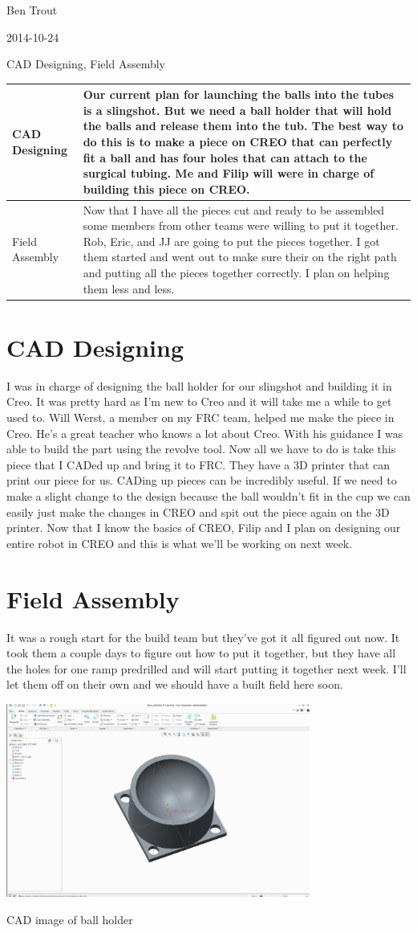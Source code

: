 Ben Trout

2014-10-24

CAD Designing, Field Assembly

\begin{tabular}{|p{5cm}|p{5cm}|}
\hline
CAD Designing&
Our current plan for launching the balls into the tubes is a slingshot. But we need a ball holder that will hold the balls and release them into the tub. The best way to do this is to make a piece on CREO that can perfectly fit a ball and has four holes that can attach to the surgical tubing. Me and Filip will were in charge of building this piece on CREO.
\\
\hline
Field Assembly&
Now that I have all the pieces cut and ready to be assembled some members from other teams were willing to put it together. Rob, Eric, and JJ are going to put the pieces together. I got them started and went out to make sure their on the right path and putting all the pieces together correctly. I plan on helping them less and less.
\\
\hline
\end{tabular}

\section*{CAD Designing}
I was in charge of designing the ball holder for our slingshot and building it in Creo. It was pretty hard as I'm new to Creo and it will take me a while to get used to. Will Werst, a member on my FRC team, helped me make the piece in Creo. He's a great teacher who knows a lot about Creo. With his guidance I was able to build the part using the revolve tool. Now all we have to do is take this piece that I CADed up and bring it to FRC. They have a 3D printer that can print our piece for us. CADing up pieces can be incredibly useful. If we need to make a slight change to the design because the ball wouldn't fit in the cup we can easily just make the changes in CREO and spit out the piece again on the 3D printer. Now that I know the basics of CREO, Filip and I plan on designing our entire robot in CREO and this is what we'll be working on next week.

\section*{Field Assembly}
It was a rough start for the build team but they’ve got it all figured out now. It took them a couple days to figure out how to put it together, but they have all the holes for one ramp predrilled and will start putting it together next week. I’ll let them off on their own and we should have a built field here soon. 

\begin{center}
\includegraphics[width=10cm]{./Entries/Images/BallHolder.PNG}
\end{center}

CAD image of ball holder
